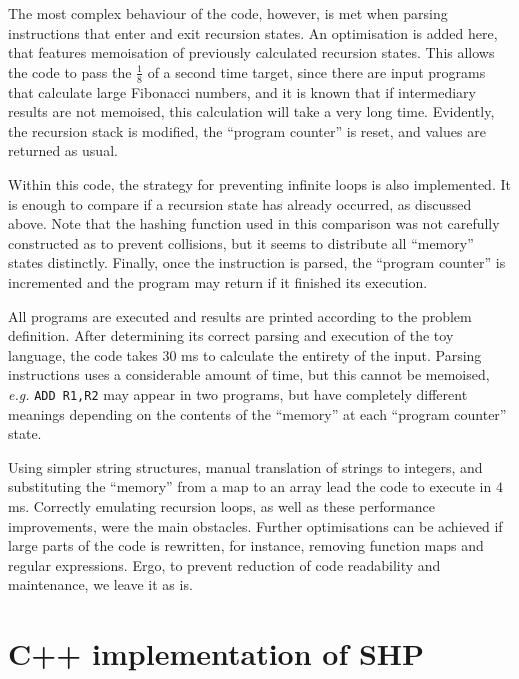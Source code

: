 \documentclass[12pt]{article}
\begin{document}
The most complex behaviour of the code, however, is met when parsing instructions that enter and exit recursion states. An optimisation is added here, that features memoisation of previously calculated recursion states. This allows the code to pass the $\frac{1}{8}$ of a second time target, since there are input programs that calculate large Fibonacci numbers, and it is known that if intermediary results are not memoised, this calculation will take a very long time. Evidently, the recursion stack is modified, the ``program counter'' is reset, and values are returned as usual.

Within this code, the strategy for preventing infinite loops is also implemented. It is enough to compare if a recursion state has already occurred, as discussed above. Note that the hashing function used in this comparison was not carefully constructed as to prevent collisions, but it seems to distribute all ``memory'' states distinctly. Finally, once the instruction is parsed, the ``program counter'' is incremented and the program may return if it finished its execution.

All programs are executed and results are printed according to the problem definition. After determining its correct parsing and execution of the toy language, the code takes $30$ ms to calculate the entirety of the input. Parsing instructions uses a considerable amount of time, but this cannot be memoised, \emph{e.g.} \texttt{ADD R1,R2} may appear in two programs, but have completely different meanings depending on the contents of the ``memory'' at each ``program counter'' state.

Using simpler string structures, manual translation of strings to integers, and substituting the ``memory'' from a map to an array lead the code to execute in $4$ ms. Correctly emulating recursion loops, as well as these performance improvements, were the main obstacles. Further optimisations can be achieved if large parts of the code is rewritten, for instance, removing function maps and regular expressions. Ergo, to prevent reduction of code readability and maintenance, we leave it as is.




\appendix

\section{C++ implementation of SHP}\label{app:impl}

\end{document}
